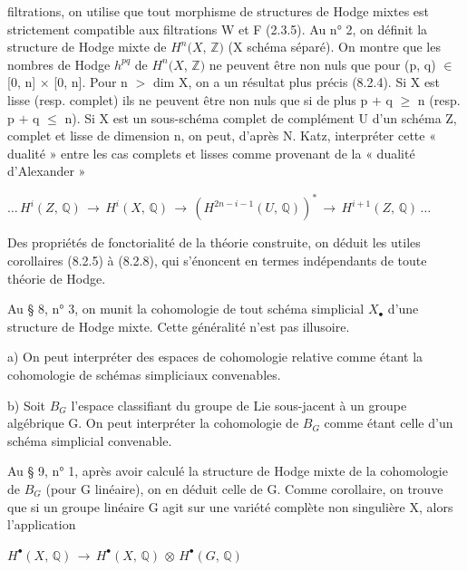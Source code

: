 \documentclass[11pt,twoside]{article}
\newcommand{\DFormula}[1]{%
  \par\smallskip\noindent\hspace*{0pt}\(\displaystyle #1\)\par\smallskip
}
\begin{document}
filtrations, on utilise que tout morphisme de structures de Hodge mixtes est strictement compatible aux filtrations W et F (2.3.5). Au n° 2, on définit la structure de Hodge mixte de \(H^{n}(X\), \(\mathbb{Z})\) (X schéma séparé). On montre que les nombres de Hodge \(h^{pq}\) de \(H^{n}(X\), \(\mathbb{Z})\) ne peuvent être non nuls que pour (p, q) \(\in \) [0, n] \(\times \) [0, n]. Pour n \(>\) dim X, on a un résultat plus précis (8.2.4). Si X est lisse (resp. complet) ils ne peuvent être non nuls que si de plus p \(+\) q \(\geq \) n (resp. p \(+\) q \(\leq \) n). Si X est un sous-schéma complet de complément U d’un schéma Z, complet et lisse de dimension n, on peut, d’après N. Katz, interpréter cette « dualité » entre les cas complets et lisses comme provenant de la « dualité d’Alexander »\par
\par\medskip
\DFormula{…\,H^{i}(Z,\,\mathbb{Q})\,\to \,H^{i}(X,\,\mathbb{Q})\,\to \,(H^{2n−i−1}(U,\,\mathbb{Q}))^{\ast }\,\to \,H^{i+1}(Z,\,\mathbb{Q})\,…}
\par\medskip
Des propriétés de fonctorialité de la théorie construite, on déduit les utiles corollaires (8.2.5) à (8.2.8), qui s’énoncent en termes indépendants de toute théorie de Hodge.\par
\par\medskip
Au § 8, n° 3, on munit la cohomologie de tout schéma simplicial \(X_{\bullet }\) d’une structure de Hodge mixte. Cette généralité n’est pas illusoire.\par
\par\medskip
a) On peut interpréter des espaces de cohomologie relative comme étant la cohomologie de schémas simpliciaux convenables.\par
\par\medskip
b) Soit \(B_{G}\) l’espace classifiant du groupe de Lie sous-jacent à un groupe algébrique G. On peut interpréter la cohomologie de \(B_{G}\) comme étant celle d’un schéma simplicial convenable.\par
\par\medskip
Au § 9, n° 1, après avoir calculé la structure de Hodge mixte de la cohomologie de \(B_{G}\) (pour G linéaire), on en déduit celle de G. Comme corollaire, on trouve que si un groupe linéaire G agit sur une variété complète non singulière X, alors l’application\par
\par\medskip
\DFormula{H^{\bullet }(X,\,\mathbb{Q})\,\to \,H^{\bullet }(X,\,\mathbb{Q})\,\otimes \,H^{\bullet }(G,\,\mathbb{Q})}
\end{document}
